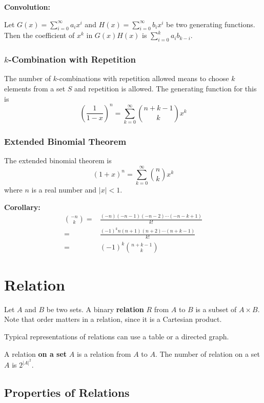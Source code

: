 \documentclass[a4paper,12pt]{article}
\begin{document}
\textbf{Convolution:}

Let $G(x) = \sum_{i=0}^{\infty} a_i x^i$ and $H(x) = \sum_{i=0}^{\infty} b_i x^i$ be two generating functions.
Then the coefficient of $x^k$ in $G(x) H(x)$ is $\sum_{i=0}^{k} a_i b_{k-i}$.

\subsubsection{$k$-Combination with Repetition}

The number of $k$-combinations with repetition allowed means to choose $k$ elements from a set $S$ and repetition is allowed.
The generating function for this is
\begin{equation*}
	\left( \frac{1}{1-x} \right)^n = \sum_{k=0}^{\infty} \binom{n+k-1}{k} x^k
\end{equation*}

\subsubsection{Extended Binomial Theorem}

The extended binomial theorem is
\begin{equation*}
	(1+x)^n = \sum_{k=0}^{\infty} \binom{n}{k} x^k
\end{equation*}
where $n$ is a real number and $|x| < 1$.

\textbf{Corollary:}
\begin{align*}
	\binom{-n}{k} =& \frac{(-n)(-n-1)(-n-2) \cdots (-n-k+1)}{k!} \\
	=& \frac{(-1)^k n(n+1)(n+2) \cdots (n+k-1)}{k!} \\
	=& (-1)^k \binom{n+k-1}{k}
\end{align*}

\section{Relation}

Let $A$ and $B$ be two sets.
A binary \textbf{relation} $R$ from $A$ to $B$ is a subset of $A \times B$.
Note that order matters in a relation, since it is a Cartesian product.

Typical representations of relations can use a table or a directed graph.

A relation \textbf{on a set} $A$ is a relation from $A$ to $A$.
The number of relation on a set $A$ is $2^{|A|^2}$.

\subsection{Properties of Relations}
\end{document}
